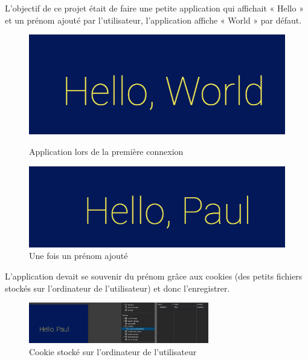 L’objectif de ce projet était de faire une petite application qui affichait « Hello » et un prénom ajouté par l’utilisateur, l’application affiche « World » par défaut.

\begin{figure}[ht]
    \centering
    \begin{minipage}{.45\textwidth}
        \centering
        \includegraphics[width=\linewidth]{image/sbHelloWorld}
        \caption{Application lors de la première connexion}
        \label{fig:sbHelloWorld}
    \end{minipage}%
    \hfill
    \begin{minipage}{.45\textwidth}
        \centering
        \includegraphics[width=\linewidth]{image/sbHelloPaul}
        \caption{Une fois un prénom ajouté}
        \label{fig:sbHelloPaul}
    \end{minipage}
\end{figure}

L’application devait se souvenir du prénom grâce aux cookies (des petits fichiers stockés sur l'ordinateur de l'utilisateur) et donc l’enregistrer.

\begin{figure}[ht]
    \centering
    \includegraphics[width=0.7\textwidth]{image/sbCookie}
    \caption{Cookie stocké sur l'ordinateur de l'utilisateur}
    \label{fig:sbCookie}
\end{figure}

